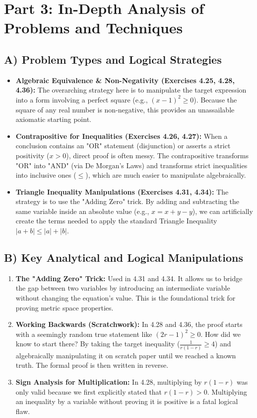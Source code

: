 \documentclass[11pt]{article}
\newcommand{\abs}[1]{\left|#1\right|}
\begin{document}
\newpage
\section{Part 3: In-Depth Analysis of Problems and Techniques}

\subsection{A) Problem Types and Logical Strategies}
\begin{itemize}
    \item \textbf{Algebraic Equivalence \& Non-Negativity (Exercises 4.25, 4.28, 4.36):} The overarching strategy here is to manipulate the target expression into a form involving a perfect square (e.g., $(x-1)^2 \ge 0$). Because the square of any real number is non-negative, this provides an unassailable axiomatic starting point.
    \item \textbf{Contrapositive for Inequalities (Exercises 4.26, 4.27):} When a conclusion contains an "OR" statement (disjunction) or asserts a strict positivity ($x > 0$), direct proof is often messy. The contrapositive transforms "OR" into "AND" (via De Morgan's Laws) and transforms strict inequalities into inclusive ones ($\le$), which are much easier to manipulate algebraically.
    \item \textbf{Triangle Inequality Manipulations (Exercises 4.31, 4.34):} The strategy is to use the "Adding Zero" trick. By adding and subtracting the same variable inside an absolute value (e.g., $x = x + y - y$), we can artificially create the terms needed to apply the standard Triangle Inequality $\abs{a+b} \le \abs{a} + \abs{b}$.
\end{itemize}

\subsection{B) Key Analytical and Logical Manipulations}
\begin{enumerate}
    \item \textbf{The "Adding Zero" Trick:} Used in 4.31 and 4.34. It allows us to bridge the gap between two variables by introducing an intermediate variable without changing the equation's value. This is the foundational trick for proving metric space properties.
    \item \textbf{Working Backwards (Scratchwork):} In 4.28 and 4.36, the proof starts with a seemingly random true statement like $(2r-1)^2 \ge 0$. How did we know to start there? By taking the target inequality ($\frac{1}{r(1-r)} \ge 4$) and algebraically manipulating it on scratch paper until we reached a known truth. The formal proof is then written in reverse.
    \item \textbf{Sign Analysis for Multiplication:} In 4.28, multiplying by $r(1-r)$ was only valid because we first explicitly stated that $r(1-r) > 0$. Multiplying an inequality by a variable without proving it is positive is a fatal logical flaw.
\end{enumerate}
\end{document}
